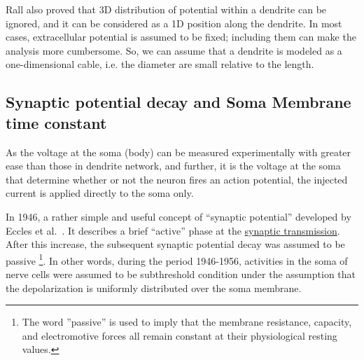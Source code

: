 Rall also proved that 3D distribution of potential within a dendrite can be
ignored, and it can be considered as a 1D position along the dendrite. In most
cases, extracellular potential is assumed to be fixed; including them can make
the analysis more cumbersome.  So, we can assume that a dendrite is modeled as a
one-dimensional cable, i.e. the diameter are small relative to the length. 



\subsection[Decay and Time-constant]{Synaptic potential decay and Soma Membrane
time constant}
\label{sec:synapt-potent-decay}

As the voltage at the soma (body) can be measured experimentally with
greater ease than those in dendrite network, and further, it is the
voltage at the soma that determine whether or not the neuron fires an
action potential, the injected current is applied directly to the soma
only.

In 1946, a rather simple and useful concept of ``synaptic potential''
developed by Eccles et al.~\cite{eccles1946spm}. It describes a brief
``active'' phase at the
\hyperref[chap:synapse-model-interc]{synaptic transmission}. After this
increase, the subsequent synaptic potential decay was assumed to be
passive
\footnote{ The word ''passive'' is used to imply that the membrane
  resistance, capacity, and electromotive forces all remain constant
  at their physiological resting values.}.
In other words, during the period 1946-1956, activities in the soma of
nerve cells were assumed to be subthreshold condition under the
assumption that the depolarization is uniformly distributed over the
soma membrane.


